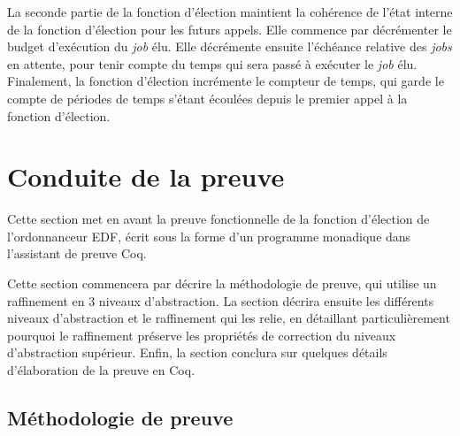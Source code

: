 		La seconde partie de la fonction d'élection maintient la cohérence de l'état interne de la fonction d'élection pour les futurs appels. Elle commence par décrémenter le budget d'exécution du \emph{job} élu. Elle décrémente ensuite l'échéance relative des \emph{jobs} en attente, pour tenir compte du temps qui sera passé à exécuter le \emph{job} élu. Finalement, la fonction d'élection incrémente le compteur de temps, qui garde le compte de périodes de temps s'étant écoulées depuis le premier appel à la fonction d'élection.

	\section{Conduite de la preuve}

	\label{sec:proof}
	Cette section met en avant la preuve fonctionnelle de la fonction d'élection de l'ordonnanceur EDF, écrit sous la forme d'un programme monadique dans l'assistant de preuve Coq.

	Cette section commencera par décrire la méthodologie de preuve, qui utilise un raffinement en 3 niveaux d'abstraction. La section décrira ensuite les différents niveaux d'abstraction et le raffinement qui les relie, en détaillant particulièrement pourquoi le raffinement préserve les propriétés de correction du niveaux d'abstraction supérieur. Enfin, la section conclura sur quelques détails d'élaboration de la preuve en Coq.

	\subsection{Méthodologie de preuve}

